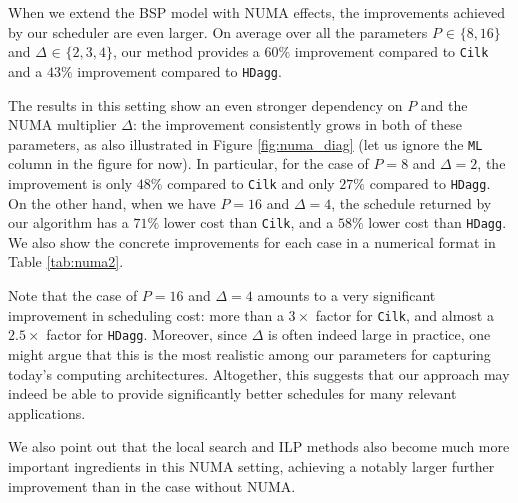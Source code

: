 \documentclass[sigconf,nonacm]{acmart}
\begin{document}
When we extend the BSP model with NUMA effects, the improvements achieved by our scheduler are even larger. On average over all the parameters $P _{\!} \in _{\!} \{ 8, 16 \}$ and $\Delta _{\!} \in _{\!} \{ 2,3,4 \}$, our method provides a $60\%$ improvement compared to \texttt{Cilk} and a $43\%$ improvement compared to \texttt{HDagg}.

The results in this setting show an even stronger dependency on $P$ and the NUMA multiplier $\Delta$: the improvement consistently grows in both of these parameters, as also illustrated in Figure \ref{fig:numa_diag} (let us ignore the \texttt{ML} column in the figure for now). In particular, for the case of $P=8$ and $\Delta=2$, the improvement is only $48\%$ compared to \texttt{Cilk} and only $27\%$ compared to \texttt{HDagg}. On the other hand, when we have $P=16$ and $\Delta=4$, the schedule returned by our algorithm has a $71\%$ lower cost than \texttt{Cilk}, and a $58\%$ lower cost than \texttt{HDagg}. We also show the concrete improvements for each case in a numerical format in Table \ref{tab:numa2}.

Note that the case of $P=16$ and $\Delta=4$ amounts to a very significant improvement in scheduling cost: more than a $3\times$ factor for \texttt{Cilk}, and almost a $2.5\times$ factor for \texttt{HDagg}. Moreover, since $\Delta$ is often indeed large in practice, one might argue that this is the most realistic among our parameters for capturing today's computing architectures. Altogether, this suggests that our approach may indeed be able to provide significantly better schedules for many relevant applications.

We also point out that the local search and ILP methods also become much more important ingredients in this NUMA setting, achieving a notably larger further improvement than in the case without NUMA.
\end{document}
